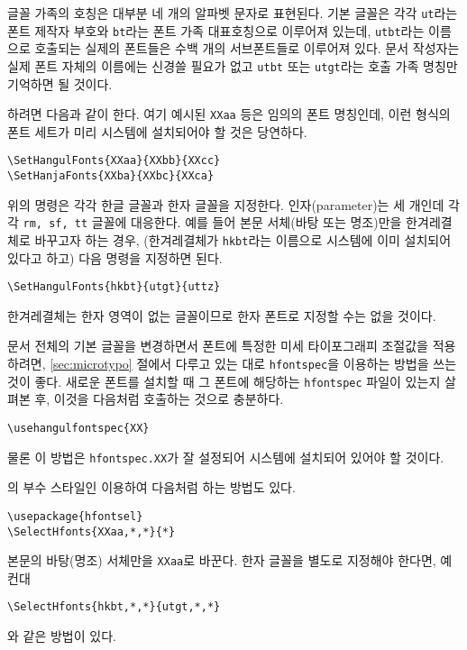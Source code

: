 글꼴 가족의 호칭은 대부분 네 개의 알파벳 문자로 표현된다. 기본 글꼴은
각각 \texttt{ut}라는 폰트 제작자 부호와 \texttt{bt}라는 폰트 가족
대표호칭으로 이루어져 있는데, \texttt{utbt}라는 이름으로 호출되는
실제의 폰트들은 수백 개의 서브폰트들로 이루어져 있다. 문서 작성자는
실제 폰트 자체의 이름에는 신경쓸 필요가 없고 \texttt{utbt} 또는
\texttt{utgt}라는 호출 가족 명칭만 기억하면 될 것이다. 

하려면 다음과 같이 한다. 여기 예시된
\texttt{XXaa} 등은 임의의 폰트 명칭인데, 이런 형식의 폰트 세트가
미리 시스템에 설치되어야 할 것은 당연하다.

\begin{Verbatim}[fontsize=\small]
\SetHangulFonts{XXaa}{XXbb}{XXcc}
\SetHanjaFonts{XXba}{XXbc}{XXca}
\end{Verbatim}

위의 명령은 각각 한글 글꼴과 한자 글꼴을 지정한다.
인자(parameter)는 세 개인데 각각 \texttt{rm, sf, tt} 글꼴에 대응한다.
예를 들어 본문 서체(바탕 또는 명조)만을 한겨레결체로 바꾸고자 하는 경우,
(한겨레결체가 \texttt{hkbt}라는 이름으로 시스템에 이미 설치되어
있다고 하고) 다음 명령을 지정하면 된다.

\begin{verbatim}
\SetHangulFonts{hkbt}{utgt}{uttz}
\end{verbatim}
한겨레결체는 한자 영역이 없는 글꼴이므로 한자 폰트로 지정할 수는 없을
것이다. 

문서 전체의 기본 글꼴을 변경하면서 폰트에 특정한 미세 타이포그래피
조절값을 적용하려면, \ref{sec:microtypo} 절에서 다루고 있는 대로
\verb|hfontspec|을 이용하는 방법을 쓰는 것이 좋다. 새로운 폰트를
설치할 때 그 폰트에 해당하는 \verb|hfontspec| 파일이 있는지 살펴본 후,
이것을 다음처럼 호출하는 것으로 충분하다.
\begin{verbatim}
\usehangulfontspec{XX}
\end{verbatim}
물론 이 방법은 \verb|hfontspec.XX|가 잘 설정되어 시스템에 설치되어
있어야 할 것이다. 

의 부수 스타일인 \를 이용하여
다음처럼 하는 방법도 있다.
\begin{verbatim}
\usepackage{hfontsel}
\SelectHfonts{XXaa,*,*}{*}
\end{verbatim}
본문의 바탕(명조) 서체만을 \verb|XXaa|로 바꾼다. 한자 글꼴을 별도로
지정해야 한다면, 예컨대
\begin{verbatim}
\SelectHfonts{hkbt,*,*}{utgt,*,*}
\end{verbatim}
와 같은 방법이 있다.

